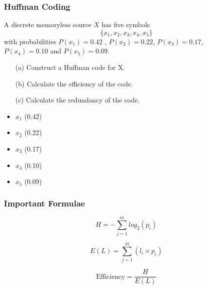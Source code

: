 \documentclass{beamer}
\begin{document}
\begin{frame}
	\large
	\frametitle{Huffman Coding}
 A discrete memoryless source $X$ has five symbols \[\{x_1,x_2,x_3,x_4,x_5\}\] with probabilities $P(x_1) = 0.42$ , $P(x_2) = 0.22$, $P(x_3) = 0.17$, $P(x_4) = 0.10$ and $P(x_5) = 0.09$.

\begin{itemize}
	\item [(a)] Construct a Huffman code for X.
	\item [(b)] Calculate the efficiency of the code.
	\item [(c)] Calculate the redundancy of the code.
\end{itemize}


\end{frame}



\begin{frame}
	
\begin{itemize}
\item $x_1$ (0.42) \bigskip \bigskip
\item $x_2$ (0.22) \bigskip \bigskip
\item $x_3$ (0.17) \bigskip \bigskip
\item $x_4$ (0.10) \bigskip \bigskip
\item $x_5$ (0.09)
\end{itemize}
\end{frame}

\begin{frame}
	\LARGE
\frametitle{Important Formulae}
\[H = - \sum_{j=1}^{m} log_{2}(p_{i})\] \bigskip

\[E(L) = \sum_{j=1}^{m} (l_{i} \times p_{i})\] \bigskip

\[\mbox{Efficiency} = \frac{H }{ E(L) }\]
\end{frame}
\end{document}
